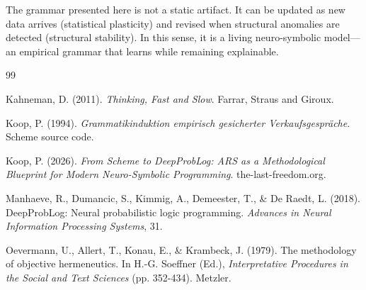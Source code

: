 \documentclass[12pt,a4paper]{article}
\begin{document}
The grammar presented here is not a static artifact. It can be updated as
new data arrives (statistical plasticity) and revised when structural
anomalies are detected (structural stability). In this sense, it is a
living neuro-symbolic model—an empirical grammar that learns while
remaining explainable.

\newpage
\begin{thebibliography}{99}

Kahneman, D. (2011). \textit{Thinking, Fast and Slow}. Farrar, Straus and Giroux.

Koop, P. (1994). \textit{Grammatikinduktion empirisch gesicherter 
Verkaufsgespräche}. Scheme source code.

Koop, P. (2026). \textit{From Scheme to DeepProbLog: ARS as a Methodological
Blueprint for Modern Neuro-Symbolic Programming}. the-last-freedom.org.

Manhaeve, R., Dumancic, S., Kimmig, A., Demeester, T., \& De Raedt, L. (2018).
DeepProbLog: Neural probabilistic logic programming. \textit{Advances in
Neural Information Processing Systems}, 31.

Oevermann, U., Allert, T., Konau, E., \& Krambeck, J. (1979). The methodology
of objective hermeneutics. In H.-G. Soeffner (Ed.), \textit{Interpretative
Procedures in the Social and Text Sciences} (pp. 352-434). Metzler.

\end{thebibliography}
\end{document}
